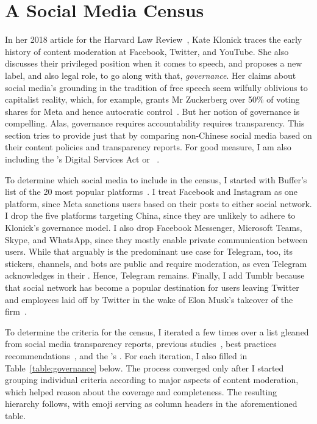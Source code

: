 \section{A Social Media Census}
\label{sec:census}

In her 2018 article for the Harvard Law Review~\cite{Klonick2018}, Kate Klonick
traces the early history of content moderation at Facebook, Twitter, and
YouTube. She also discusses their privileged position when it comes to speech,
and proposes a new label, and also legal role, to go along with that,
\emph{governance}. Her claims about social media's grounding in the tradition of
free speech seem wilfully oblivious to capitalist reality, which, for example,
grants Mr Zuckerberg over 50\% of voting shares for Meta and hence autocratic
control~\cite{LauricellaNorton2021}. But her notion of governance is compelling.
Alas, governance requires accountability requires transparency. This section
tries to provide just that by comparing non-Chinese social media based on their
content policies and transparency reports. For good measure, I am also including
the \EU's Digital Services Act or \DSA~\cite{EuropeanParliamentAndCouncil2022}.

To determine which social media to include in the census, I started with
Buffer's list of the 20 most popular platforms~\cite{Lua2022}. I treat Facebook
and Instagram as one platform, since Meta sanctions users based on their posts
to either social network. I drop the five platforms targeting China, since they
are unlikely to adhere to Klonick's governance model. I also drop Facebook
Messenger, Microsoft Teams, Skype, and WhatsApp, since they mostly enable
private communication between users. While that arguably is the predominant use
case for Telegram, too, its stickers, channels, and bots are public and require
moderation, as even Telegram acknowledges in their \FAQ. Hence, Telegram
remains. Finally, I add Tumblr because that social network has become a popular
destination for users leaving Twitter and employees laid off by Twitter in the
wake of Elon Musk's takeover of the firm~\cite{Patel2022}.

To determine the criteria for the census, I iterated a few times over a list
gleaned from social media transparency reports, previous
studies~\cite{BradfordGriselea2019,CrockerGebhartea2019}, best practices
recommendations~\cite{AccessNowACLUFoundationOfNorthernCaliforniaea2021}, and
the \EU's \DSA. For each iteration, I also filled in
Table~\ref{table:governance} below. The process converged only after I started
grouping individual criteria according to major aspects of content moderation,
which helped reason about the coverage and completeness. The resulting hierarchy
follows, with emoji serving as column headers in the aforementioned table.

